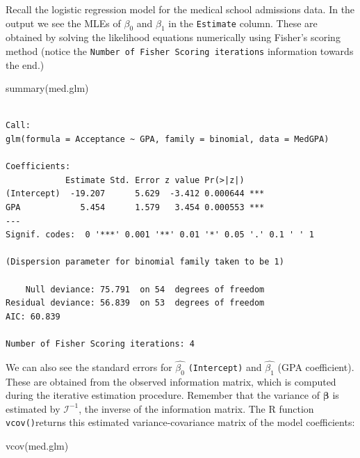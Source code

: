 \documentclass[
  a4paper,
  DIV=11,
  numbers=noendperiod]{scrreprt}
\newenvironment{Shaded}{\begin{snugshade}}{\end{snugshade}}
\newcommand{\FunctionTok}[1]{\textcolor[rgb]{0.28,0.35,0.67}{#1}}
\newcommand{\NormalTok}[1]{\textcolor[rgb]{0.00,0.23,0.31}{#1}}
\newenvironment{fbxSimple}[3]{\begin{tcolorbox}[enhanced, breakable,%
attach boxed title to top*={xshift=1.4pt},
boxed title style={boxrule=0.0mm, fuzzy shadow={1pt}{-1pt}{0mm}{0.1mm}{gray}, arc=.3em, rounded corners=east, sharp corners=west}, colframe=#1-color2, colbacktitle=#1-color1, colback = white, coltitle=black,  titlerule=0mm, toprule=0pt, bottomrule=.7pt, leftrule=.3em, rightrule=.7pt, outer arc=.3em,  	left=.5em, right=.5em, bottomtitle=1mm, toptitle=1mm,title=\textbf{#2}\hspace{0.5em}{#3}]}
{\end{tcolorbox}}
\begin{document}
\begin{fbxSimple}{Example}{Example 8: }{Hypothesis test and confidence interval for the GPA coefficient in the model for medical school admissions}
\label{hypothesis-test-and-confidence-interval-for-the-gpa-coefficient-in-the-model-for-medical-school-admissions}
Recall the logistic regression model for the medical school admissions
data. In the output we see the MLEs of \(\beta_0\) and \(\beta_1\) in
the \texttt{Estimate} column. These are obtained by solving the
likelihood equations numerically using Fisher's scoring method (notice
the \texttt{Number\ of\ Fisher\ Scoring\ iterations} information towards
the end.)

\begin{Shaded}
\begin{Highlighting}[]
\FunctionTok{summary}\NormalTok{(med.glm)}
\end{Highlighting}
\end{Shaded}

\begin{verbatim}

Call:
glm(formula = Acceptance ~ GPA, family = binomial, data = MedGPA)

Coefficients:
            Estimate Std. Error z value Pr(>|z|)    
(Intercept)  -19.207      5.629  -3.412 0.000644 ***
GPA            5.454      1.579   3.454 0.000553 ***
---
Signif. codes:  0 '***' 0.001 '**' 0.01 '*' 0.05 '.' 0.1 ' ' 1

(Dispersion parameter for binomial family taken to be 1)

    Null deviance: 75.791  on 54  degrees of freedom
Residual deviance: 56.839  on 53  degrees of freedom
AIC: 60.839

Number of Fisher Scoring iterations: 4
\end{verbatim}

We can also see the standard errors for \(\hat{\beta_0}\)
\texttt{(Intercept)} and \(\hat{\beta_1}\) (GPA coefficient). These are
obtained from the observed information matrix, which is computed during
the iterative estimation procedure. Remember that the variance of
\(\boldsymbol{\beta}\) is estimated by \(\mathcal{I}^{-1}\), the inverse
of the information matrix. The R function \texttt{vcov()}returns this
estimated variance-covariance matrix of the model coefficients:

\begin{Shaded}
\begin{Highlighting}[]
\FunctionTok{vcov}\NormalTok{(med.glm)}
\end{Highlighting}
\end{Shaded}


\end{fbxSimple}
\end{document}
